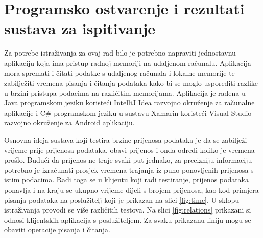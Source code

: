 \documentclass[times, utf8, zavrsni, square]{fer}
\begin{document}
\chapter{Programsko ostvarenje i rezultati sustava za ispitivanje}
Za potrebe istraživanja za ovaj rad bilo je potrebno napraviti jednostavnu aplikaciju koja ima pristup radnoj memoriji na udaljenom računalu.
Aplikacija mora spremati i čitati podatke s udaljenog računala i lokalne memorije te zabilježiti vremena pisanja i čitanja podataka kako bi se moglo usporediti razlike u brzini pristupa podacima na različitim memorijama.
Aplikacija je rađena u Java programskom jeziku koristeći IntelliJ Idea razvojno okruženje za računalne aplikacije i C\# programskom jeziku u sustavu Xamarin koristeći Visual Studio razvojno okruženje za Android aplikaciju.

Osnovna ideja sustava koji testira brzine prijenosa podataka je da se zabilježi vrijeme prije prijenosa podataka, 
obavi prijenos i onda odredi koliko je vremena prošlo. 
Budući da prijenos ne traje svaki put jednako, za precizniju informaciju potrebno je izračunati prosjek vremena trajanja iz puno ponovljenih prijenosa s istim podacima.
Radi toga se u klijentu koji radi testiranje, prijenos podataka ponavlja i na kraju se ukupno vrijeme dijeli s brojem prijenosa, kao kod primjera pisanja podataka na poslužitelj koji je prikazan na slici \ref{fig:time}. 
U sklopu istraživanja provodi se više različitih testova. 
Na slici \ref{fig:relations} prikazani si odnosi klijentskih aplikacija s poslužiteljem. Za svaku prikazanu liniju mogu se obaviti operacije pisanja i čitanja.
\end{document}

